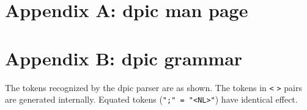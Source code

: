 \documentclass[11pt]{article}
\begin{document}



\clearpage
\section{Appendix A: dpic man page}
%

\clearpage
\section{Appendix B: dpic grammar}
The tokens recognized by the dpic parser are as shown.  The tokens
in {\tt <} {\tt >} pairs are generated internally.  Equated tokens
({\tt ";" = "<NL>"}) have identical effect.
\end{document}
